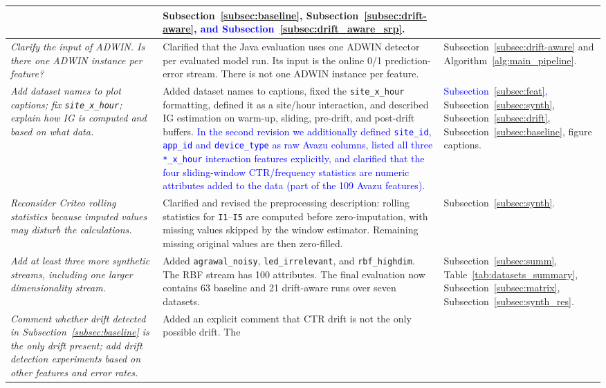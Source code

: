 \documentclass[12pt]{article}
\newcommand{\new}[1]{\textcolor{blue}{#1}}
\begin{document}
{\begin{longtable}{|>{\raggedright\arraybackslash}p{}
                |>{\raggedright\arraybackslash}p{}
                |>{\raggedright\arraybackslash}p{}|}
{their voting weight temporarily reduced.}
&
Subsection~\ref{subsec:baseline}, Subsection~\ref{subsec:drift-aware}\new{, and
Subsection~\ref{subsec:drift_aware_srp}}. \\
\hline
\textit{Clarify the input of ADWIN. Is there one ADWIN instance per feature?}
&
Clarified that the Java evaluation uses one ADWIN detector per evaluated model
run. Its input is the online 0/1 prediction-error stream. There is not one
ADWIN instance per feature.
&
Subsection~\ref{subsec:drift-aware} and Algorithm~\ref{alg:main_pipeline}. \\
\hline
\textit{Add dataset names to plot captions; fix \texttt{site\_x\_hour}; explain
how IG is computed and based on what data.}
&
Added dataset names to captions, fixed the \texttt{site\_x\_hour} formatting,
defined it as a site/hour interaction, and described IG estimation on warm-up,
sliding, pre-drift, and post-drift buffers. \new{In the second revision we
additionally defined \texttt{site\_id}, \texttt{app\_id} and \texttt{device\_type}
as raw Avazu columns, listed all three \texttt{*\_x\_hour} interaction features
explicitly, and clarified that the four sliding-window CTR/frequency statistics
are numeric attributes added to the data (part of the 109 Avazu features).}
&
\new{Subsection~\ref{subsec:feat},} Subsection~\ref{subsec:synth}, Subsection~\ref{subsec:drift}, Subsection~\ref{subsec:baseline}, figure captions. \\
\hline
\textit{Reconsider Criteo rolling statistics because imputed values may disturb
the calculations.}
&
Clarified and revised the preprocessing description: rolling statistics for
\texttt{I1}--\texttt{I5} are computed before zero-imputation, with missing
values skipped by the window estimator. Remaining missing original values are
then zero-filled.
&
Subsection~\ref{subsec:synth}. \\
\hline
\textit{Add at least three more synthetic streams, including one larger
dimensionality stream.}
&
Added \texttt{agrawal\_noisy}, \texttt{led\_irrelevant}, and
\texttt{rbf\_highdim}. The RBF stream has 100 attributes. The final evaluation
now contains 63 baseline and 21 drift-aware runs over seven datasets.
&
Subsection~\ref{subsec:summ}, Table~\ref{tab:datasets_summary}, Subsection~\ref{subsec:matrix}, Subsection~\ref{subsec:synth_res}. \\
\hline
\textit{Comment whether drift detected in Subsection~\ref{subsec:baseline} is the only drift present;
add drift detection experiments based on other features and error rates.}
&
Added an explicit comment that CTR drift is not the only possible drift. The

\end{longtable}}
\end{document}
